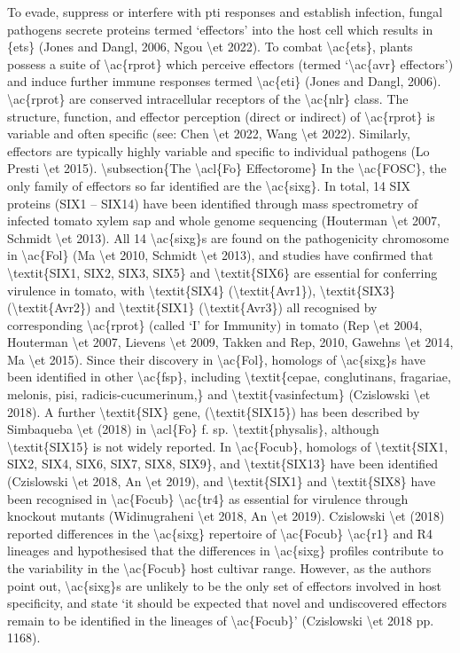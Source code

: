 To evade, suppress or interfere with \ac{pti} responses and establish infection, fungal pathogens secrete proteins termed ‘effectors’ into the host cell which results in \ac{{ets} (Jones and Dangl, 2006, Ngou \et 2022). To combat \ac{ets}, plants possess a suite of \ac{rprot} which perceive effectors (termed ‘\ac{avr} effectors’) and induce further immune responses termed \ac{eti} (Jones and Dangl, 2006). \ac{rprot} are conserved intracellular receptors of the \ac{nlr} class. The structure, function, and effector perception (direct or indirect) of \ac{rprot} is variable and often specific (see: Chen \et 2022, Wang \et 2022). Similarly, effectors are typically highly variable and specific to individual pathogens (Lo Presti \et 2015).  


\subsection{The \acl{Fo} Effectorome}

In the \ac{FOSC}, the only family of effectors so far identified are the \ac{sixg}. In total, 14 SIX proteins (SIX1 – SIX14) have been identified through mass spectrometry of infected tomato xylem sap and whole genome sequencing (Houterman \et 2007, Schmidt \et 2013).  All 14 \ac{sixg}s are found on the pathogenicity chromosome in \ac{Fol} (Ma \et 2010, Schmidt \et 2013), and studies have confirmed that \textit{SIX1, SIX2, SIX3, SIX5} and \textit{SIX6} are essential for conferring virulence in tomato, with  \textit{SIX4} (\textit{Avr1}), \textit{SIX3} (\textit{Avr2}) and \textit{SIX1} (\textit{Avr3}) all recognised by corresponding \ac{rprot} (called ‘I’ for Immunity) in tomato (Rep \et 2004, Houterman \et 2007, Lievens \et 2009, Takken and Rep, 2010, Gawehns \et 2014, Ma \et 2015).  

Since their discovery in \ac{Fol}, homologs of \ac{sixg}s have been identified in other \ac{fsp}, including \textit{cepae, conglutinans, fragariae, melonis, pisi, radicis-cucumerinum,} and \textit{vasinfectum} (Czislowski \et 2018). A further \textit{SIX} gene, (\textit{SIX15}) has been described by Simbaqueba \et (2018) in \acl{Fo} f. sp. \textit{physalis}, although \textit{SIX15} is not widely reported.  

In \ac{Focub}, homologs of \textit{SIX1, SIX2, SIX4, SIX6, SIX7, SIX8, SIX9}, and \textit{SIX13} have been identified (Czislowski \et 2018, An \et 2019), and \textit{SIX1} and \textit{SIX8} have been recognised in \ac{Focub} \ac{tr4} as essential for virulence through knockout mutants (Widinugraheni \et 2018, An \et 2019). Czislowski \et (2018) reported differences in the \ac{sixg} repertoire of \ac{Focub} \ac{r1} and R4 lineages and hypothesised that the differences in \ac{sixg} profiles contribute to the variability in the \ac{Focub} host cultivar range.  However, as the authors point out, \ac{sixg}s are unlikely to be the only set of effectors involved in host specificity, and state ‘it should be expected that novel and undiscovered effectors remain to be identified in the lineages of \ac{Focub}’ (Czislowski \et 2018 pp. 1168).  

}
